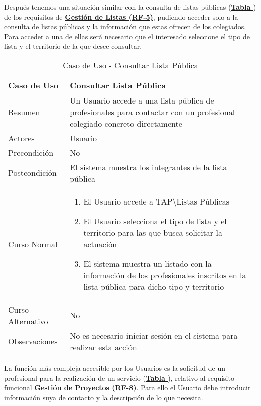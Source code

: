\addtocounter{tabla}{1}
Después tenemos una situación similar con la consulta de listas públicas (\textbf{\hyperref[tab:cuuConsultaLstPub]{Tabla }}) de los requisitos de \textbf{\hyperref[tab:rfGestLst]{Gestión de Listas (RF-5)}}, pudiendo acceder solo a la consulta de listas públicas y la información que estas ofrecen de los colegiados. Para acceder a una de ellas será necesario que el interesado seleccione el tipo de lista y el territorio de la que desee consultar.

\begin{table}[!htbp]
  \centering  \addtocounter{casouso}{1}
  \begin{tabular}{|l | p{100mm}|}
    \textbf{Caso de Uso}  & \textbf{Consultar Lista Pública} \\ \hline
    Resumen 			 & Un Usuario accede a una lista pública de profesionales para contactar con un profesional colegiado concreto directamente \\ \hline
    Actores  		 & Usuario \\ \hline
    Precondición  	 & No \\ \hline
    Postcondición  	 & El sistema muestra los integrantes de la lista pública \\ \hline
    Curso Normal   	 & \begin{enumerate}
	  \item El Usuario accede a TAP\textbackslash Listas Públicas
	  \item El Usuario selecciona el tipo de lista y el territorio para las que busca solicitar la actuación
	  \item El sistema muestra un listado con la información de los profesionales inscritos en la lista pública para dicho tipo y territorio
    \end{enumerate}  \\ \hline
    Curso Alternativo  & No  \\ \hline
    Observaciones 	 & No es necesario iniciar sesión en el sistema para realizar esta acción  \\ \hline
  \end{tabular}
  \caption{Caso de Uso  - Consultar Lista Pública}
  \label{tab:cuuConsultaLstPub}
\end{table}
\FloatBarrier

\addtocounter{tabla}{1}
La función más compleja accesible por los Usuarios es la solicitud de un profesional para la realización de un servicio (\textbf{\hyperref[tab:cuuRegPeticProf]{Tabla }}), relativo al requisito funcional \textbf{\hyperref[tab:rfGestProyectos]{Gestión de Proyectos (RF-8)}}. Para ello el Usuario debe introducir información suya de contacto y la descripción de lo que necesita. 

